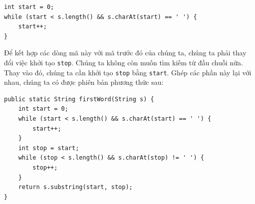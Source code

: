 \begin{verbatim}
int start = 0;
while (start < s.length() && s.charAt(start) == ' ') {
    start++;
}
\end{verbatim}

Để kết hợp các dòng mã này với mã trước đó của chúng ta, chúng ta phải thay đổi việc khởi tạo \texttt{stop}. Chúng ta không còn muốn tìm kiếm từ đầu chuỗi nữa. Thay vào đó, chúng ta cần khởi tạo \texttt{stop} bằng \texttt{start}. Ghép các phần này lại với nhau, chúng ta có được phiên bản phương thức sau:

\begin{verbatim}
public static String firstWord(String s) {
    int start = 0;
    while (start < s.length() && s.charAt(start) == ' ') {
        start++;
    }
    int stop = start;
    while (stop < s.length() && s.charAt(stop) != ' ') {
        stop++;
    }
    return s.substring(start, stop);
}
\end{verbatim}